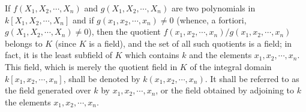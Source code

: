 If $f(X_1, X_2, \cdots, X_n)$ and $g(X_1, X_2, \cdots, X_n)$ are two polynomials in $k[X_1, X_2, \cdots, X_n]$ and if $g(x_1, x_2, \cdots, x_n) \neq 0$ (whence, a fortiori, $g(X_1, X_2, \cdots, X_n) \neq 0$), then the quotient $f(x_1, x_2, \cdots, x_n)/g(x_1, x_2, \cdots, x_n)$ belongs to $K$ (since $K$ is a field), and the set of all such quotients is a field; in fact, it is the least subfield of $K$ which contains $k$ and the elements $x_1, x_2, \cdots, x_n$. This field, which is merely the quotient field in $K$ of the integral domain $k[x_1, x_2, \cdots, x_n]$, shall be denoted by $k(x_1, x_2, \cdots, x_n)$. It shall be referred to as the field generated over $k$ by $x_1, x_2, \cdots, x_n$, or the field obtained by adjoining to $k$ the elements $x_1, x_2, \cdots, x_n$.
